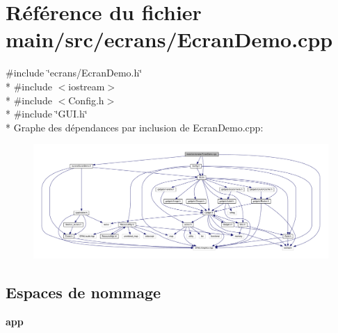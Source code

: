 \section{Référence du fichier main/src/ecrans/\+Ecran\+Demo.cpp}
\label{_ecran_demo_8cpp}
{\ttfamily \#include \char`\"{}ecrans/\+Ecran\+Demo.\+h\char`\"{}}\\*
{\ttfamily \#include $<$iostream$>$}\\*
{\ttfamily \#include $<$Config.\+h$>$}\\*
{\ttfamily \#include \char`\"{}G\+U\+I.\+h\char`\"{}}\\*
Graphe des dépendances par inclusion de Ecran\+Demo.\+cpp\+:\nopagebreak
\begin{figure}[H]
\begin{center}
\leavevmode
\includegraphics[width=350pt]{_ecran_demo_8cpp__incl}
\end{center}
\end{figure}
\subsection*{Espaces de nommage}
\begin{DoxyCompactItemize}
\item 
 {\bf app}
\end{DoxyCompactItemize}
